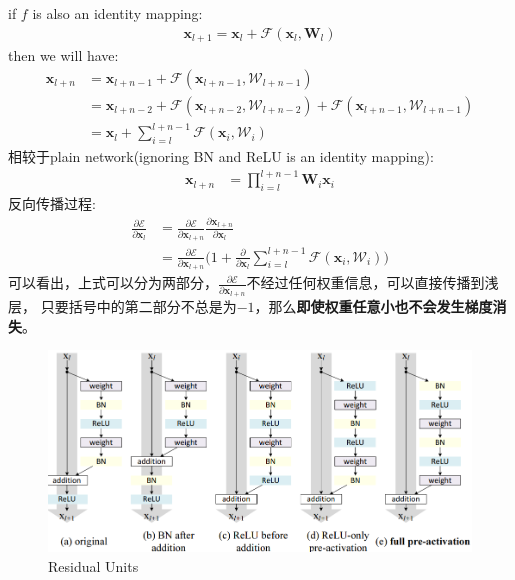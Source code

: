 if $f$ is also an identity mapping:
\begin{equation}
    \begin{split}
        \mathbf{x}_{l+1} = \mathbf{x}_l + \mathcal{F}(\mathbf{x}_l, \mathbf{W}_l)
    \end{split}
\end{equation}
then we will have:
\begin{equation}
    \begin{split}
        \mathbf{x}_{l+n} &= \mathbf{x}_{l + n - 1} + \mathcal{F}(\mathbf{x}_{l + n -1}, \mathcal{W}_{l + n -1}) \\
        &= \mathbf{x}_{l + n - 2} + \mathcal{F}(\mathbf{x}_{l + n - 2}, \mathcal{W}_{l + n - 2}) + \mathcal{F}(\mathbf{x}_{l + n -1}, \mathcal{W}_{l + n -1})\\
        &= \mathbf{x}_l + \sum_{i=l}^{l+n-1} \mathcal{F}(\mathbf{x}_i, \mathcal{W}_i)
    \end{split}
\end{equation}
相较于plain network(ignoring BN and ReLU is an identity mapping):
\begin{equation}
    \begin{split}
        \mathbf{x}_{l+n} &= \prod_{i=l}^{l+n-1} \mathbf{W}_i \mathbf{x}_i
    \end{split}
\end{equation}
反向传播过程:
\begin{equation}
    \begin{split}
        \frac{\partial \mathcal{E}}{\partial \mathbf{x}_l}
        &= \frac{\partial \mathcal{E}}{\partial \mathbf{x}_{l+n}} \frac{\partial \mathbf{x}_{l+n}}{\partial \mathbf{x}_l} \\
        &= \frac{\partial \mathcal{E}}{\partial \mathbf{x}_{l+n}} \Bigg (1 + \frac{\partial}{\partial \mathbf{x}_{l}}\sum_{i=l}^{l+n-1} \mathcal{F}(\mathbf{x}_i, \mathcal{W}_i)\Bigg)
    \end{split}
\end{equation}
可以看出，上式可以分为两部分，$\frac{\partial \mathcal{E}}{\partial \mathbf{x}_{l+n}}$不经过任何权重信息，可以直接传播到浅层，
只要括号中的第二部分不总是为$-1$，那么\textbf{即使权重任意小也不会发生梯度消失}。

\begin{figure}[H]
    \centering
    \includegraphics[width=14cm]{images/residual_units.png}
    \caption{Residual Units}
    \label{fig:residual_units}
\end{figure}

